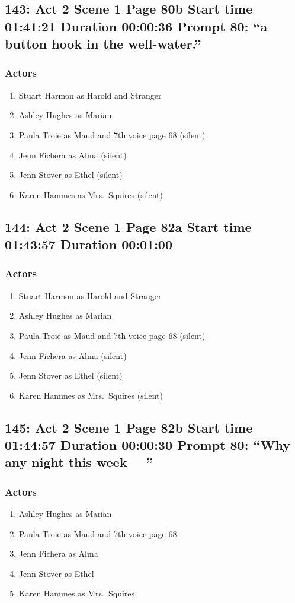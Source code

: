 \subsection{143: Act 2 Scene 1 Page 80b Start time 01:41:21 Duration 00:00:36 Prompt 80: ``a button hook in the well-water.''}

\subsubsection{Actors}
\begin{enumerate}
\item Stuart Harmon as Harold and Stranger
\item Ashley Hughes as Marian
\item Paula Troie as Maud and 7th voice page 68 (silent)
\item Jenn Fichera as Alma (silent)
\item Jenn Stover as Ethel (silent)
\item Karen Hammes as Mrs.~Squires (silent)
\end{enumerate}


\subsection{144: Act 2 Scene 1 Page 82a Start time 01:43:57 Duration 00:01:00}

\subsubsection{Actors}
\begin{enumerate}
\item Stuart Harmon as Harold and Stranger
\item Ashley Hughes as Marian
\item Paula Troie as Maud and 7th voice page 68 (silent)
\item Jenn Fichera as Alma (silent)
\item Jenn Stover as Ethel (silent)
\item Karen Hammes as Mrs.~Squires (silent)
\end{enumerate}


\subsection{145: Act 2 Scene 1 Page 82b Start time 01:44:57 Duration 00:00:30 Prompt 80: ``Why any night this week ---''}

\subsubsection{Actors}
\begin{enumerate}
\item Ashley Hughes as Marian
\item Paula Troie as Maud and 7th voice page 68
\item Jenn Fichera as Alma
\item Jenn Stover as Ethel
\item Karen Hammes as Mrs.~Squires
\end{enumerate}

